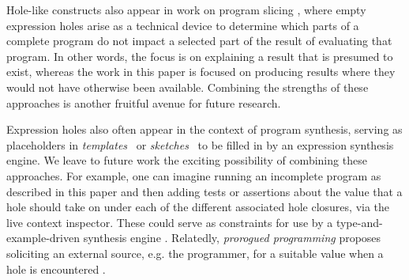 
Hole-like constructs also appear in work on program slicing
\cite{DBLP:conf/icfp/PereraACL12,DBLP:journals/pacmpl/RicciottiSPC17}, where empty expression holes arise as a technical device to determine which parts of a complete program do not impact a selected part of the result of evaluating that program. In other words, the focus is on explaining a result that is presumed to exist, whereas the work in this paper is focused on producing results where they would not have otherwise been available. Combining the strengths of these approaches is another fruitful avenue for future research.


Expression holes also often appear in the context of program synthesis, serving as
placeholders in \emph{templates}~\cite{srivastava2013template} or
\emph{sketches}~\cite{solar2009sketching} to be filled in by an expression
synthesis engine. We leave to future work the exciting possibility of combining these approaches. For example, one can imagine running an incomplete program as described in this paper and then adding tests or assertions about the value that a hole should take on under each of the different associated hole closures, via the live context inspector. These could serve as  constraints for use by a type-and-example-driven synthesis engine \cite{DBLP:conf/popl/FrankleOWZ16}. Relatedly, \emph{prorogued programming} proposes soliciting an external source, e.g. the programmer, for a suitable value when a hole is encountered \cite{DBLP:conf/oopsla/AfshariBS12}.


